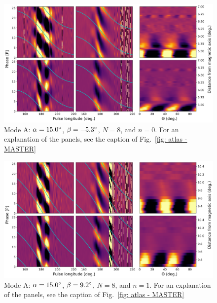 \begin{figure}
	\begin{center}
		\includegraphics[width=\atlasHeightFrac\textwidth]{Figures/B0031/atlas/A_517015008000_plots}
		\caption[Atlas results: Mode A -- $\alpha=15.0\degr$, $\beta=-5.3\degr$, $N=8$, $n=0$]{Mode A: $\alpha=15.0\degr$, $\beta=-5.3\degr$, $N=8$, and $n=0$. For an explanation of the panels, see the caption of Fig.~\ref{fig: atlas - MASTER} }
		\label{fig: atlas - A_517015008000}
	\end{center}
\end{figure}

\begin{figure}
	\begin{center}
		\includegraphics[width=\atlasHeightFrac\textwidth]{Figures/B0031/atlas/A_517015008001_plots}
		\caption[Atlas results: Mode A -- $\alpha=15.0\degr$, $\beta=9.2\degr$, $N=8$, $n=1$]{Mode A: $\alpha=15.0\degr$, $\beta=9.2\degr$, $N=8$, and $n=1$. For an explanation of the panels, see the caption of Fig.~\ref{fig: atlas - MASTER} }
		\label{fig: atlas - A_517015008001}
	\end{center}
\end{figure}

